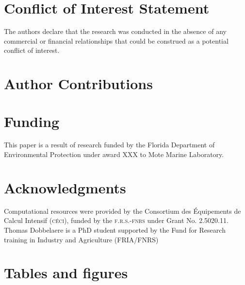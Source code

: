 \documentclass[utf8]{frontiersSCNS}
\begin{document}
\section*{Conflict of Interest Statement}
The authors declare that the research was conducted in the absence of any commercial or financial relationships that could be construed as a potential conflict of interest.

\section*{Author Contributions}
  
\section*{Funding}
This paper is a result of research funded by the Florida Department of Environmental Protection under award XXX to Mote Marine Laboratory. 

\section*{Acknowledgments}
Computational resources were provided by the Consortium des \'Equipements de Calcul Intensif (\textsc{c\'eci}), funded by the \textsc{f.r.s.-fnrs} under Grant No. 2.5020.11. Thomas Dobbelaere is a PhD student supported by the Fund for Research training in Industry and Agriculture (\textsc{FRIA}/\textsc{FNRS})


 



\section*{Tables and figures}
\end{document}
